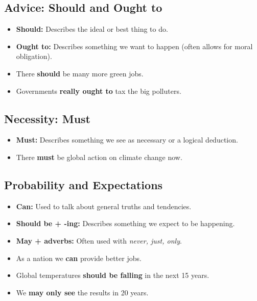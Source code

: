 \subsection{Advice: Should and Ought to}
\begin{itemize}
    \item \textbf{Should:} Describes the ideal or best thing to do.
    \item \textbf{Ought to:} Describes something we want to happen (often allows for moral obligation).
\end{itemize}
\begin{examplebox}[title=Examples]
\begin{itemize}
    \item There \textbf{should} be many more green jobs.
    \item Governments \textbf{really ought to} tax the big polluters.
\end{itemize}
\end{examplebox}

\subsection{Necessity: Must}
\begin{itemize}
    \item \textbf{Must:} Describes something we see as necessary or a logical deduction.
\end{itemize}
\begin{examplebox}[title=Example]
\begin{itemize}
    \item There \textbf{must} be global action on climate change now.
\end{itemize}
\end{examplebox}

\subsection{Probability and Expectations}
\begin{itemize}
    \item \textbf{Can:} Used to talk about general truths and tendencies.
    \item \textbf{Should be + -ing:} Describes something we expect to be happening.
    \item \textbf{May + adverbs:} Often used with \textit{never, just, only}.
\end{itemize}
\begin{examplebox}[title=Examples]
\begin{itemize}
    \item As a nation we \textbf{can} provide better jobs.
    \item Global temperatures \textbf{should be falling} in the next 15 years.
    \item We \textbf{may only see} the results in 20 years.
\end{itemize}
\end{examplebox}

